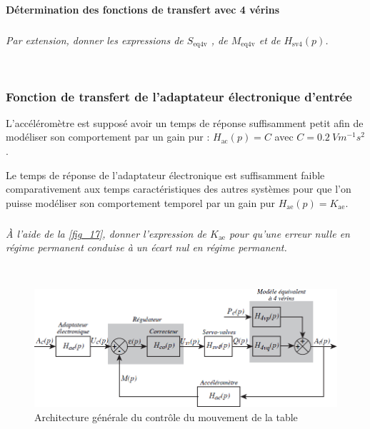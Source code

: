 \documentclass[10pt,fleqn]{article} %
\begin{document}
\paragraph{Détermination des fonctions de transfert avec 4 vérins}

\subparagraph{\label{q_28}}\textit{Par extension, donner les expressions de $S_{\text{eq4v}}$ , de $M_{\text{eq4v}}$ et de $H_{\text{sv4}}(p)$.}
\ifprof
\begin{corrige} ~\\

\end{corrige}
\else
\fi

\subsubsection{Fonction de transfert de l’adaptateur électronique d’entrée}

L’accéléromètre est supposé avoir un temps de réponse suffisamment petit afin de modéliser son comportement
par un gain pur : $H_{\text{ac}} (p) = C$ avec $C = \SI{0,2}{Vm^{-1} s^2}$.

Le temps de réponse de l’adaptateur électronique est suffisamment faible comparativement aux temps
caractéristiques des autres systèmes pour que l’on puisse modéliser son comportement temporel par un gain
pur $H_{\text{ae}} (p)=K_{\text{ae}}$.


\subparagraph{\label{q_29}}\textit{À l’aide de la \autoref{fig_17}, donner l’expression de $K_{\text{ae}}$ pour qu’une erreur nulle en régime
permanent conduise à un écart nul en régime permanent.}
\ifprof
\begin{corrige} ~\\

\end{corrige}
\else
\fi



\begin{figure}[H]
\centering
\includegraphics[width=0.7\linewidth]{fig_17}
\caption{Architecture générale du contrôle du mouvement de la table \label{fig_17}}
\end{figure}
\end{document}
